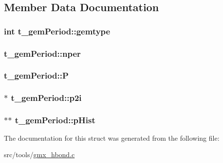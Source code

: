 \subsection{\-Member \-Data \-Documentation}
\hypertarget{structt__gemPeriod_a4545f8bfdeb4198ad29950e5ef3bd95a}{
\subsubsection[{gemtype}]{\setlength{\rightskip}{0pt plus 5cm}int {\bf t\-\_\-gem\-Period\-::gemtype}}}\label{structt__gemPeriod_a4545f8bfdeb4198ad29950e5ef3bd95a}
\hypertarget{structt__gemPeriod_aae90d510ff9b4db70fe819303d1ba08b}{
\subsubsection[{nper}]{ {\bf t\-\_\-gem\-Period\-::nper}}}\label{structt__gemPeriod_aae90d510ff9b4db70fe819303d1ba08b}
\hypertarget{structt__gemPeriod_aba08a8101bfee729edd8218d11d00793}{
\subsubsection[{\-P}]{ {\bf t\-\_\-gem\-Period\-::\-P}}}\label{structt__gemPeriod_aba08a8101bfee729edd8218d11d00793}
\hypertarget{structt__gemPeriod_ac5e508a6c5359bca692c6e8925ac5043}{
\subsubsection[{p2i}]{$\ast$ {\bf t\-\_\-gem\-Period\-::p2i}}}\label{structt__gemPeriod_ac5e508a6c5359bca692c6e8925ac5043}
\hypertarget{structt__gemPeriod_a15c29bc306427460c3b3e91a0f68d69c}{
\subsubsection[{p\-Hist}]{$\ast$$\ast$ {\bf t\-\_\-gem\-Period\-::p\-Hist}}}\label{structt__gemPeriod_a15c29bc306427460c3b3e91a0f68d69c}


\-The documentation for this struct was generated from the following file\-:\begin{DoxyCompactItemize}
\item 
src/tools/\hyperlink{gmx__hbond_8c}{gmx\-\_\-hbond.\-c}\end{DoxyCompactItemize}
